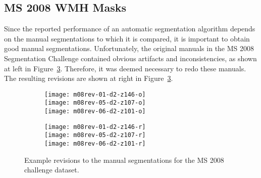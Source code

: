 \subsection{MS 2008 WMH Masks}\label{ss:m08-rev}
Since the reported performance of an automatic segmentation algorithm depends on
the manual segmentations to which it is compared,
it is important to obtain good manual segmentations.
Unfortunately, the original manuals in the MS 2008 Segmentation Challenge
contained obvious artifacts and inconsistencies,
as shown at left in Figure~\ref{fig:m08-rev}.
Therefore, it was deemed necessary to redo these manuals.
The resulting revisions are shown at right in Figure~\ref{fig:m08-rev}.
\begin{figure}
  \centering
  \begin{minipage}{6cm}
    \begin{subfigure}{\textwidth}
      \centering{}%
      \label{fig:m08-rev-o}
      \texttt{[image: m08rev-01-d2-z146-o]}\\[0.2em]
      \texttt{[image: m08rev-05-d2-z107-o]}\\[0.2em]
      \texttt{[image: m08rev-06-d2-z101-o]}
    \end{subfigure}
  \end{minipage}
  \begin{minipage}{6cm}
    \begin{subfigure}{\textwidth}
      \centering{}%
      \label{fig:m08-rev-r}
      \texttt{[image: m08rev-01-d2-z146-r]}
        \makebox[0pt][r]{\textcolor{white}{ CHB 01 }}\\[0.2em]
      \texttt{[image: m08rev-05-d2-z107-r]}
        \makebox[0pt][r]{\textcolor{white}{ CHB 05 }}\\[0.2em]
      \texttt{[image: m08rev-06-d2-z101-r]}
        \makebox[0pt][r]{\textcolor{white}{ CHB 06 }}
    \end{subfigure}
  \end{minipage}
  \caption{Example revisions to the manual segmentations for the MS 2008 challenge dataset.}%
  \label{fig:m08-rev}
\end{figure}
